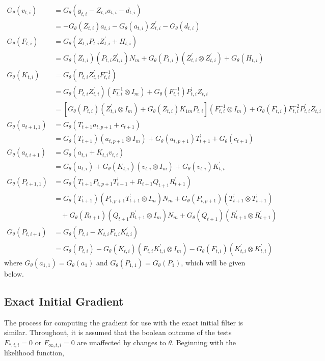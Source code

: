 \documentclass[12pt]{article}
\newcommand{\Gt}{G_\theta}
\begin{document}
	\begin{align*}
	\Gt(v_{t,i}) &= \Gt(y_{t,i} - Z_{t,i} a_{t,i} - d_{t,i}) \\
	&= -\Gt(Z_{t,i}) a_{t,i} - \Gt(a_{t,i}) Z_{t,i}^\prime - \Gt(d_{t,i}) \\
	\Gt(F_{t,i}) &= \Gt(Z_{t,i} P_{t,i} Z_{t,i}^\prime + H_{t,i}) \\
	&= \Gt(Z_{t,i})(P_{t,i} Z_{t,i}^\prime) N_m + \Gt(P_{t,i}) (Z_{t,i}^\prime \otimes Z_{t,i}^\prime) + \Gt(H_{t,i}) \\
	\Gt(K_{t,i}) &= \Gt(P_{t,i} Z_{t,i}^\prime F_{t,i}^{-1}) \\
	&= \Gt(P_{t,i} Z_{t,i}^\prime) (F_{t,i}^{-1} \otimes I_m) + \Gt(F_{t,i}^{-1}) P_{t,i}^\prime Z_{t,i} \\
	&= \left[ \Gt(P_{t,i}) (Z_{t,i}^\prime \otimes I_m) + \Gt(Z_{t,i}) K_{1m} P_{t,i} \right] (F_{t,i}^{-1} \otimes I_m) + \Gt(F_{t,i}) F_{t,i}^{-2} P_{t,i}^\prime Z_{t,i} \\
	\Gt(a_{t+1,1}) &= \Gt(T_{t+1} a_{t,p+1} + c_{t+1}) \\
	&= \Gt(T_{t+1}) (a_{t,p+1} \otimes I_m) + \Gt(a_{t,p+1}) T_{t+1}^\prime + \Gt(c_{t+1})\\ 
	\Gt(a_{t,i+1}) &= \Gt(a_{t,i} + K_{t,i} v_{t,i}) \\
	&= \Gt(a_{t,i}) + \Gt(K_{t,i})(v_{t,i} \otimes I_m) + \Gt(v_{t,i})K_{t,i}^\prime \\
	\Gt(P_{t+1,1}) &= \Gt(T_{t+1} P_{t,p+1} T_{t+1}^\prime + R_{t+1} Q_{t+1} R_{t+1}^\prime) \\
	&= \Gt(T_{t+1})(P_{t,p+1} T_{t+1}^\prime \otimes I_m) N_m + \Gt(P_{t,p+1})(T_{t+1}^\prime \otimes T_{t+1}^\prime) \\
	&\quad + \Gt(R_{t+1})(Q_{t+1} R_{t+1}^\prime \otimes I_m) N_m + \Gt(Q_{t+1})(R_{t+1}^\prime \otimes R_{t+1}^\prime) \\
	\Gt(P_{t,i+1}) &= \Gt(P_{t,i} - K_{t,i} F_{t,i} K_{t,i}^\prime) \\ 
	&= \Gt(P_{t,i}) - \Gt(K_{t,i})(F_{t,i}K_{t,i}^\prime \otimes I_m) - \Gt(F_{t,i})(K_{t,i}^\prime \otimes K_{t,i}^\prime)
	\end{align*}
	where $\Gt(a_{1,1}) = \Gt(a_1)$ and $\Gt(P_{1,1}) = \Gt(P_1)$, which will be given below. 

\subsection*{Exact Initial Gradient}
	The process for computing the gradient for use with the exact initial filter is similar. Throughout, it is assumed that the boolean outcome of the tests $F_{*,t,i} = 0$ or $F_{\infty,t,i} = 0$ are unaffected by changes to $\theta$. Beginning with the likelihood function, 
	
\end{document}

